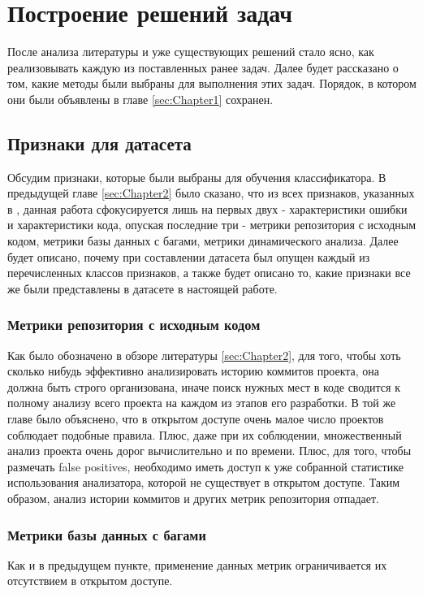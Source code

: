 \chapter{Построение решений задач}
\label{sec:Chapter3} 

После анализа литературы и уже существующих решений стало ясно, как реализовывать каждую из поставленных ранее задач. Далее будет рассказано о том, какие методы были выбраны для выполнения этих задач. Порядок, в котором они были объявлены в главе \ref{sec:Chapter1} сохранен.

\section{Признаки для датасета}

Обсудим признаки, которые были выбраны для обучения классификатора. В предыдущей главе \ref{sec:Chapter2} было сказано, что из всех признаков, указанных в \cite{HECKMAN2011363}, данная работа сфокусируется лишь на первых двух - характеристики ошибки и характеристики кода, опуская последние три - метрики репозитория с исходным кодом, метрики базы данных с багами, метрики динамического анализа. Далее будет описано, почему при составлении датасета был опущен каждый из перечисленных классов признаков, а также будет описано то, какие признаки все же были представлены в датасете в настоящей работе.

\subsection{Метрики репозитория с исходным кодом}
Как было обозначено в обзоре литературы \ref{sec:Chapter2}, для того, чтобы хоть сколько нибудь эффективно анализировать историю коммитов проекта, она должна быть строго организована, иначе поиск нужных мест в коде сводится к полному анализу всего проекта на каждом из этапов его разработки. В той же главе было объяснено, что в открытом доступе очень малое число проектов соблюдает подобные правила. Плюс, даже при их соблюдении, множественный анализ проекта очень дорог вычислительно и по времени. Плюс, для того, чтобы размечать false positives, необходимо иметь доступ к уже собранной статистике использования анализатора, которой не существует в открытом доступе. Таким образом, анализ истории коммитов и других метрик репозитория отпадает.

\subsection{Метрики базы данных с багами}
Как и в предыдущем пункте, применение данных метрик ограничивается их отсутствием в открытом доступе.

